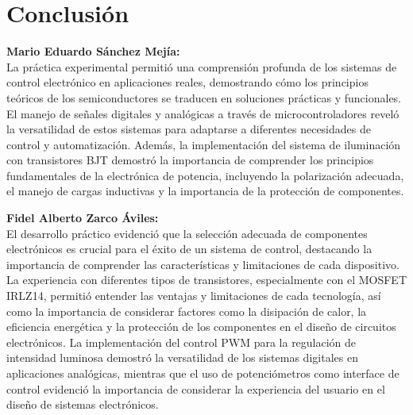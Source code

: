 
\section{Conclusión}
\textbf{Mario Eduardo Sánchez Mejía:\\}
La práctica experimental permitió una comprensión profunda de los sistemas de control electrónico en aplicaciones reales, demostrando cómo los principios teóricos de los semiconductores se traducen en soluciones prácticas y funcionales. El manejo de señales digitales y analógicas a través de microcontroladores reveló la versatilidad de estos sistemas para adaptarse a diferentes necesidades de control y automatización. Además, la implementación del sistema de iluminación con transistores BJT demostró la importancia de comprender los principios fundamentales de la electrónica de potencia, incluyendo la polarización adecuada, el manejo de cargas inductivas y la importancia de la protección de componentes.

\textbf{Fidel Alberto Zarco Áviles:\\}
El desarrollo práctico evidenció que la selección adecuada de componentes electrónicos es crucial para el éxito de un sistema de control, destacando la importancia de comprender las características y limitaciones de cada dispositivo. La experiencia con diferentes tipos de transistores, especialmente con el MOSFET IRLZ14, permitió entender las ventajas y limitaciones de cada tecnología, así como la importancia de considerar factores como la disipación de calor, la eficiencia energética y la protección de los componentes en el diseño de circuitos electrónicos. La implementación del control PWM para la regulación de intensidad luminosa demostró la versatilidad de los sistemas digitales en aplicaciones analógicas, mientras que el uso de potenciómetros como interface de control evidenció la importancia de considerar la experiencia del usuario en el diseño de sistemas electrónicos.